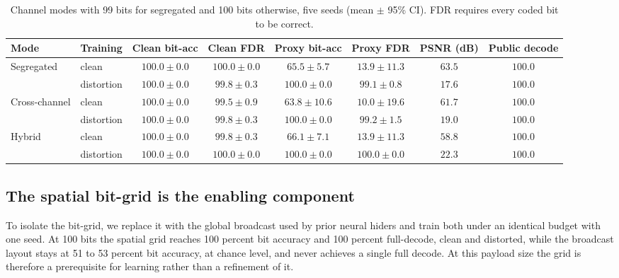 \documentclass[conference]{IEEEtran}
\begin{document}
\begin{table}[t]
\centering
\caption{Channel modes with 99 bits for segregated and 100 bits otherwise, five seeds
(mean $\pm$ 95\% CI). FDR requires every coded bit to be correct.}
\label{tab:modes}
\begin{tabular}{llcccccc}
\toprule
Mode & Training & Clean bit-acc & Clean FDR & Proxy bit-acc & Proxy FDR & PSNR (dB) & Public decode \\
\midrule
\multirow{2}{*}{Segregated}    & clean      & $100.0\pm0.0$ & $100.0\pm0.0$ & $65.5\pm5.7$  & $13.9\pm11.3$ & $63.5$ & $100.0$ \\
                               & distortion & $100.0\pm0.0$ & $99.8\pm0.3$  & $100.0\pm0.0$ & $99.1\pm0.8$  & $17.6$ & $100.0$ \\
\multirow{2}{*}{Cross-channel} & clean      & $100.0\pm0.0$ & $99.5\pm0.9$  & $63.8\pm10.6$ & $10.0\pm19.6$ & $61.7$ & $100.0$ \\
                               & distortion & $100.0\pm0.0$ & $99.8\pm0.3$  & $100.0\pm0.0$ & $99.2\pm1.5$  & $19.0$ & $100.0$ \\
\multirow{2}{*}{Hybrid}        & clean      & $100.0\pm0.0$ & $99.8\pm0.3$  & $66.1\pm7.1$  & $13.9\pm11.3$ & $58.8$ & $100.0$ \\
                               & distortion & $100.0\pm0.0$ & $100.0\pm0.0$ & $100.0\pm0.0$ & $100.0\pm0.0$ & $22.3$ & $100.0$ \\
\bottomrule
\end{tabular}
\end{table}

\subsection{The spatial bit-grid is the enabling component}
\label{ssec:ablation}
To isolate the bit-grid, we replace it with the global broadcast used by prior neural
hiders and train both under an identical budget with one seed. At 100 bits
the spatial grid reaches 100 percent bit accuracy and 100 percent full-decode, clean and
distorted, while the broadcast layout stays at 51 to 53 percent bit accuracy, at chance
level, and never achieves a single full decode. At this payload size the grid is therefore
a prerequisite for learning rather than a refinement of it.
\end{document}
